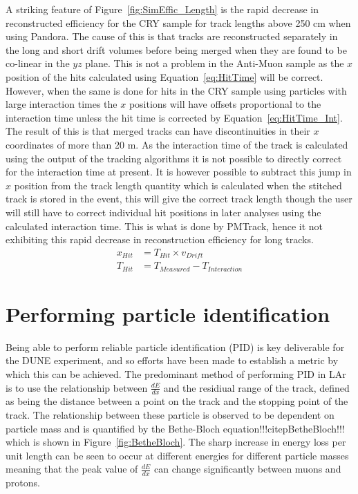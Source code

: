 A striking feature of Figure~\ref{fig:SimEffic_Length} is the rapid decrease in reconstructed efficiency for the CRY sample for track lengths above 250 cm when using Pandora. The cause of this is that tracks are reconstructed separately in the long and short drift volumes before being merged when they are found to be co-linear in the $yz$ plane. This is not a problem in the Anti-Muon sample as the $x$ position of the hits calculated using Equation~\ref{eq:HitTime} will be correct. However, when the same is done for hits in the CRY sample using particles with large interaction times the $x$ positions will have offsets proportional to the interaction time unless the hit time is corrected by Equation~\ref{eq:HitTime_Int}. The result of this is that merged tracks can have discontinuities in their $x$ coordinates of more than 20 m. As the interaction time of the track is calculated using the output of the tracking algorithms it is not possible to directly correct for the interaction time at present. It is however possible to subtract this jump in $x$ position from the track length quantity which is calculated when the stitched track is stored in the event, this will give the correct track length though the user will still have to correct individual hit positions in later analyses using the calculated interaction time. This is what is done by PMTrack, hence it not exhibiting this rapid decrease in reconstruction efficiency for long tracks. \\

\begin{subequations} \begin{align}
  x_{Hit} &= T_{Hit} \times v_{Drift} \label{eq:HitTime} \\
  T_{Hit} &= T_{Measured} - T_{Interaction} \label{eq:HitTime_Int}
\end{align} \end{subequations}



\section{Performing particle identification}  %
Being able to perform reliable particle identification (PID) is key deliverable for the DUNE experiment, and so efforts have been made to establish a metric by which this can be achieved. The predominant method of performing PID in LAr is to use the relationship between $\frac{dE}{dx}$ and the residiual range of the track, defined as being the distance between a point on the track and the stopping point of the track. The relationship between these particle is observed to be dependent on particle mass and is quantified by the Bethe-Bloch equation!!!citep{BetheBloch}!!! which is shown in Figure~\ref{fig:BetheBloch}. The sharp increase in energy loss per unit length can be seen to occur at different energies for different particle masses meaning that the peak value of $\frac{dE}{dx}$ can change significantly between muons and protons. \\

